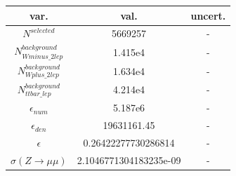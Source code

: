 \begin{tabular}{ | c | c | c |}
  \hline			
  var. & val. & uncert. \\
  \hline 
  
  $N^{selected}$ & 5669257 & - \\
  
  $N^{background}_{Wminus\_2lep}$ & 1.415e4 & - \\
  
  $N^{background}_{Wplus\_2lep}$ & 1.634e4 & - \\
  
  $N^{background}_{ttbar\_lep}$ & 4.214e4 & - \\
  
  $\epsilon_{num}$ & 5.187e6 & - \\
  
  $\epsilon_{den}$ & 19631161.45 & - \\
  \hline  
  $\epsilon$ & 0.26422277730286814 & - \\
  $\sigma(Z \rightarrow \mu\mu)$ &   2.1046771304183235e-09
& - \\
  \hline  
\end{tabular}

